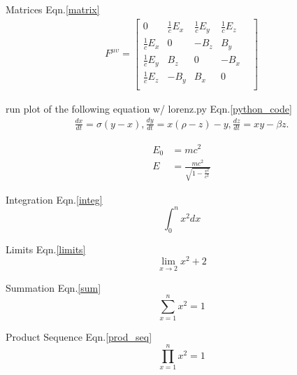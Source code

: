 \documentclass{article}		%
\begin{document}
Matrices Eqn.\ref{matrix}
  \begin{align}
	F^{\mu\upsilon} =
	\begin{bmatrix}
	0 & \frac{1}{c}E_x & \frac{1}{c}E_y & \frac{1}{c}E_z & \\
	\frac{1}{c}E_x & 0 & -B_z & B_y  \\	
	\frac{1}{c}E_y & B_z & 0 & -B_x  \\	
	\frac{1}{c}E_z & -B_y & B_x & 0  \\		
	\end{bmatrix}
	\label{matrix}
  \end{align} 


run plot of the following equation w/ lorenz.py Eqn.\ref{python_code}
  \begin{align}
	\frac{dx}{dt}=\sigma(y-x), \frac{dy}{dt}=x(\rho-z)-y, \frac{dz}{dt}=xy - \beta z.
	\label{python_code}
  \end{align} 
  
  \begin{align}
    E_0 &= mc^2 \\
    E &= \frac{mc^2}{\sqrt{1-\frac{v^2}{c^2}}}
  \end{align} 

Integration  Eqn.\ref{integ}
  \begin{equation}
	\int_{0}^{n}x^2 dx
	\label{integ}	
  \end{equation}   

Limits  Eqn.\ref{limits}
  \begin{equation}
	\lim_{x\to2}x^2+2
	\label{limits}
  \end{equation} 

Summation Eqn.\ref{sum}
  \begin{equation}
	\sum_{x=1}^{n}x^2=1
	\label{sum}	
  \end{equation}   
  
Product Sequence Eqn.\ref{prod_seq}
  \begin{equation}
	\prod_{x=1}^{n}x^2=1
	\label{prod_seq}	
  \end{equation}   
\end{document}
